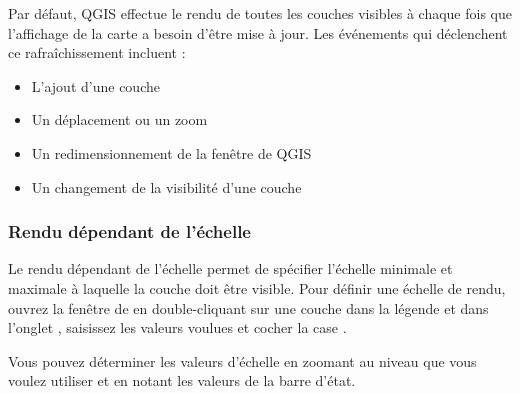 Par défaut, QGIS effectue le rendu de toutes les couches visibles à chaque fois que l'affichage de la carte a besoin d'être mise à jour. Les événements qui déclenchent ce rafraîchissement incluent :

\begin{itemize}
\item L'ajout d'une couche
\item Un déplacement ou un zoom
\item Un redimensionnement de la fenêtre de QGIS
\item Un changement de la visibilité d'une couche
\end{itemize}

%
%
%
%

\subsubsection{Rendu dépendant de l'échelle}
\label{label_scaledepend}

Le rendu dépendant de l'échelle permet de spécifier l'échelle minimale et maximale à laquelle la couche doit être visible. Pour définir une échelle de rendu, ouvrez la fenêtre de  en double-cliquant sur une couche dans la légende et dans l'onglet , saisissez les valeurs voulues et cocher la case .

Vous pouvez déterminer les valeurs d'échelle en zoomant au niveau que vous voulez utiliser et en notant les valeurs de la barre d'état.


